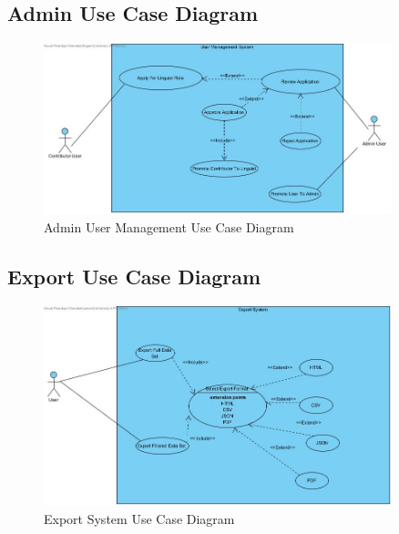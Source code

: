 \documentclass[12pt]{article}
\begin{document}
\subsection{Admin Use Case Diagram}
\begin{figure}[H]
  \centering
  \includegraphics[width=0.9\textwidth]{Admin-User-Management.jpg}
  \caption{Admin User Management Use Case Diagram}
  \label{fig:admin-use-case}
\end{figure}

\subsection{Export Use Case Diagram}
\begin{figure}[H]
  \centering
  \includegraphics[width=0.9\textwidth]{Export System.jpg}
  \caption{Export System Use Case Diagram}
  \label{fig:export-use-case}
\end{figure}
\end{document}
